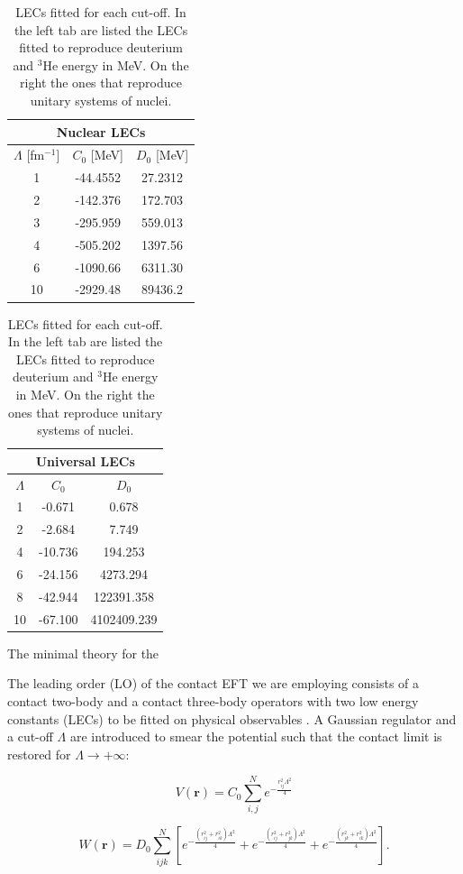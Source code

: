 \documentclass[aps,onecolumn,preprintnumbers,amsmath,amssymb,nofootinbib,superscriptaddress,notitlepage]{revtex4-1}
\begin{document}
\begin{table}
    \centering
    \begin{tabular}{|ccc|}
    \hline
    \multicolumn{3}{|c|}{Nuclear LECs}\\
    \hline
         $\Lambda$ [fm$^{-1}$] & $C_0$ [MeV] & $D_0$ [MeV] \\
1   &	-44.4552	&	27.2312 \\
2	&   -142.376	&	172.703 \\
3	&   -295.959	&	559.013 \\
4	&   -505.202	&	1397.56 \\
6	&   -1090.66	&	6311.30 \\
10	&   -2929.48	&	89436.2 \\
    \hline
    \end{tabular}
    \quad
\begin{tabular}{|ccc|}
    \hline
    \multicolumn{3}{|c|}{Universal LECs}\\
    \hline        
        $\Lambda$  & $C_0$  & $D_0$  \\
1	&   -0.671	&	0.678 \\
2	&   -2.684	&	7.749 \\
4	&   -10.736	&	194.253 \\
6	&   -24.156	&	4273.294 \\
8	&   -42.944	&	122391.358 \\
10	&   -67.100	&	4102409.239 \\
    \hline
\end{tabular}
    \caption{LECs fitted for each cut-off. In the left tab are listed the LECs fitted to reproduce deuterium and $^3$He energy in MeV. On the right the ones that reproduce unitary systems of nuclei.}
    \label{tab:LECs_unprojected}
\end{table}

The minimal theory for the 

The leading order (LO) of the contact EFT we are employing consists of a contact two-body and a contact three-body operators with two low energy constants (LECs) to be fitted on physical observables \cite{vanKolck:1999mw}. 
A Gaussian regulator and a cut-off $\Lambda$ are introduced to smear the potential such that the contact limit is restored for $\Lambda\rightarrow+\infty$: 

\begin{equation}
    V(\textbf{r})=C_0 \sum_{i,j}^N e^{-\frac{r_{ij}^2\Lambda^2}{4}}
\end{equation}

\begin{equation}
    W(\textbf{r})=D_0 \sum_{ijk}^N \left[
    e^{-\frac{(r_{ij}^2+r_{ik}^2)\Lambda^2}{4}}+
    e^{-\frac{(r_{ij}^2+r_{jk}^2)\Lambda^2}{4}}+
    e^{-\frac{(r_{jk}^2+r_{ik}^2)\Lambda^2}{4}}\right].
\end{equation}
\end{document}
